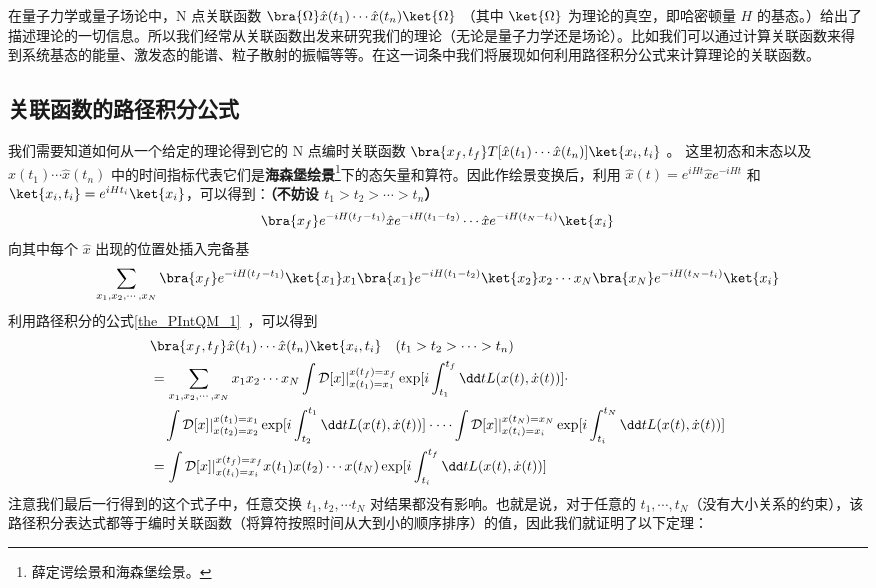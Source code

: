 
在量子力学或量子场论中，N 点关联函数 $\bra{\Omega}\hat x(t_1)\cdots \hat x(t_n)\ket{\Omega}$ （其中 $\ket{\Omega}$ 为理论的真空，即哈密顿量 $H$ 的基态。）给出了描述理论的一切信息。所以我们经常从关联函数出发来研究我们的理论（无论是量子力学还是场论）。比如我们可以通过计算关联函数来得到系统基态的能量、激发态的能谱、粒子散射的振幅等等。在这一词条中我们将展现如何利用路径积分公式来计算理论的关联函数。
\subsection{关联函数的路径积分公式}
我们需要知道如何从一个给定的理论得到它的 N 点编时关联函数
 $\bra{x_f,t_f} T[\hat x(t_1)\cdots \hat x(t_n)]\ket{x_i,t_i}$ 。
这里初态和末态以及 $\hat x(t_1)\cdots \hat x(t_n)$ 中的时间指标代表它们是\textbf{海森堡绘景}\footnote{薛定谔绘景和海森堡绘景。}下的态矢量和算符。因此作绘景变换后，利用 $\hat x(t)=e^{iHt}\hat x e^{-iHt}$ 和 $\ket{x_i,t_i}=e^{iHt_i} \ket{x_i}$，可以得到：\textbf{（不妨设 $t_1>t_2>\cdots >t_n$）}
\begin{equation}
\begin{aligned}
\bra{x_f} e^{-iH (t_f-t_1)} \hat x e^{-iH(t_1-t_2)}\cdots \hat x e^{-iH(t_N-t_i)}\ket{x_i}
\end{aligned}
\end{equation}
向其中每个 $\hat x$ 出现的位置处插入完备基
\begin{equation}
\begin{aligned}
\sum_{x_1,x_2,\cdots,x_N}\bra{x_f} e^{-iH (t_f-t_1)} \ket{x_{1}}x_1\bra{x_1} e^{-iH(t_1-t_2)}\ket{x_2}x_2\cdots x_N \bra{x_N} e^{-iH(t_N-t_i)}\ket{x_i}
\end{aligned}
\end{equation}
利用路径积分的公式\autoref{the_PIntQM_1}~，可以得到
\begin{equation}
\begin{aligned}
&\bra{x_f,t_f} \hat x(t_1)\cdots \hat x(t_n)\ket{x_i,t_i}\quad (t_1>t_2>\cdots >t_n)\\
&=\sum_{x_1,x_2,\cdots,x_N}x_1x_2\cdots x_N
\int \mathcal{D}[x]|_{x(t_1)=x_1}^{x(t_f)=x_f} \exp[i\int_{t_1}^{t_f} \dd t L(x(t),\dot x(t))] \cdot \\
&\quad \int \mathcal{D}[x]|_{x(t_2)=x_2}^{x(t_1)=x_1}
\exp[i\int_{t_2}^{t_1} \dd t L(x(t),\dot x(t))]
\cdot \cdots 
\int \mathcal{D}[x]|_{x(t_i)=x_i}^{x(t_N)=x_N} 
\exp[i\int_{t_i}^{t_N} \dd t L(x(t),\dot x(t))]\\
&=\int \mathcal{D}[x]|_{x(t_i)=x_i}^{x(t_f)=x_f} x(t_1)x(t_2)\cdots x(t_N) \exp[i\int_{t_i}^{t_f} \dd t L(x(t),\dot x(t))]
\end{aligned}
\end{equation}
注意我们最后一行得到的这个式子中，任意交换 $t_1,t_2,\cdots t_N$ 对结果都没有影响。也就是说，对于任意的 $t_1,\cdots,t_N$（没有大小关系的约束），该路径积分表达式都等于编时关联函数（将算符按照时间从大到小的顺序排序）的值，因此我们就证明了以下定理：

